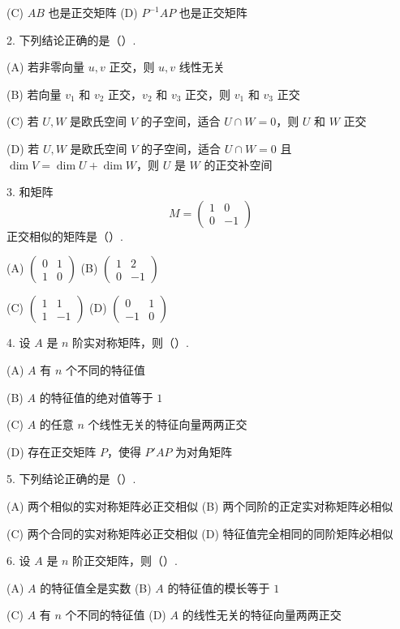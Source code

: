 \documentclass[UTF8, 12pt, fontset=fandol, oneside]{ctexart}
\begin{document}
(C) $AB$ 也是正交矩阵 \qquad (D) $P^{-1}AP$ 也是正交矩阵

2. 下列结论正确的是（\quad ）.

(A) 若非零向量 $u,v$ 正交，则 $u,v$ 线性无关

(B) 若向量 $v_1$ 和 $v_2$ 正交，$v_2$ 和 $v_3$ 正交，则 $v_1$ 和 $v_3$ 正交

(C) 若 $U,W$ 是欧氏空间 $V$ 的子空间，适合 $U\cap W=0$，则 $U$ 和 $W$ 正交

(D) 若 $U,W$ 是欧氏空间 $V$ 的子空间，适合 $U\cap W=0$ 且 $\dim V=\dim U+\dim W$，则 $U$ 是 $W$ 的正交补空间

3. 和矩阵
\[
M=\begin{pmatrix}
1&0\\
0&-1
\end{pmatrix}
\]
正交相似的矩阵是（\quad ）.

(A) $\begin{pmatrix}0&1\\1&0\end{pmatrix}$ \qquad
(B) $\begin{pmatrix}1&2\\0&-1\end{pmatrix}$

(C) $\begin{pmatrix}1&1\\1&-1\end{pmatrix}$ \qquad
(D) $\begin{pmatrix}0&1\\-1&0\end{pmatrix}$

4. 设 $A$ 是 $n$ 阶实对称矩阵，则（\quad ）.

(A) $A$ 有 $n$ 个不同的特征值

(B) $A$ 的特征值的绝对值等于 $1$

(C) $A$ 的任意 $n$ 个线性无关的特征向量两两正交

(D) 存在正交矩阵 $P$，使得 $P'AP$ 为对角矩阵

5. 下列结论正确的是（\quad ）.

(A) 两个相似的实对称矩阵必正交相似 \qquad
(B) 两个同阶的正定实对称矩阵必相似

(C) 两个合同的实对称矩阵必正交相似 \qquad
(D) 特征值完全相同的同阶矩阵必相似

6. 设 $A$ 是 $n$ 阶正交矩阵，则（\quad ）.

(A) $A$ 的特征值全是实数 \qquad
(B) $A$ 的特征值的模长等于 $1$

(C) $A$ 有 $n$ 个不同的特征值 \qquad
(D) $A$ 的线性无关的特征向量两两正交
\end{document}
